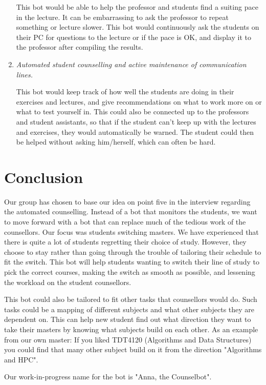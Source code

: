 \documentclass[pdftex, 12pt, norsk, a4paper, twoside]{article}
\numberwithin{equation}{section}
\numberwithin{figure}{section}
\numberwithin{table}{section}
\begin{document}
\begin{enumerate}
This bot would be able to help the professor and students find a suiting pace in the lecture. It can be embarrassing to ask the professor to repeat something or lecture slower. This bot would continuously ask the students on their PC for questions to the lecture or if the pace is OK, and display it to the professor after compiling the results.

\item \textit{Automated student counselling and active maintenance of communication lines. }

This bot would keep track of how well the students are doing in their exercises and lectures, and give recommendations on what to work more on or what to test yourself in. This could also be connected up to the professors and student assistants, so that if the student can't keep up with the lectures and exercises, they would automatically be warned. The student could then be helped without asking him/herself, which can often be hard.

\end{enumerate}
\section{Conclusion}
Our group has chosen to base our idea on point five in the interview regarding the automated counselling. Instead of a bot that monitors the students, we want to move forward with a bot that can replace much of the tedious work of the counsellors. Our focus was students switching masters. We have experienced that there is quite a lot of students regretting their choice of study. However, they choose to stay rather than going through the trouble of tailoring their schedule to fit the switch. This bot will help students wanting to switch their line of study to pick the correct courses, making the switch as smooth as possible, and lessening the workload on the student counsellors.
\par This bot could also be tailored to fit other tasks that counsellors would do. Such tasks could be a mapping of different subjects and what other subjects they are dependent on. This can help new student find out what direction they want to take their masters by knowing what subjects build on each other. As an example from our own master: If you liked TDT4120 (Algorithms and Data Structures) you could find that many other subject build on it from the direction "Algorithms and HPC".

Our work-in-progress name for the bot is "Anna, the Counselbot".
\end{document}
